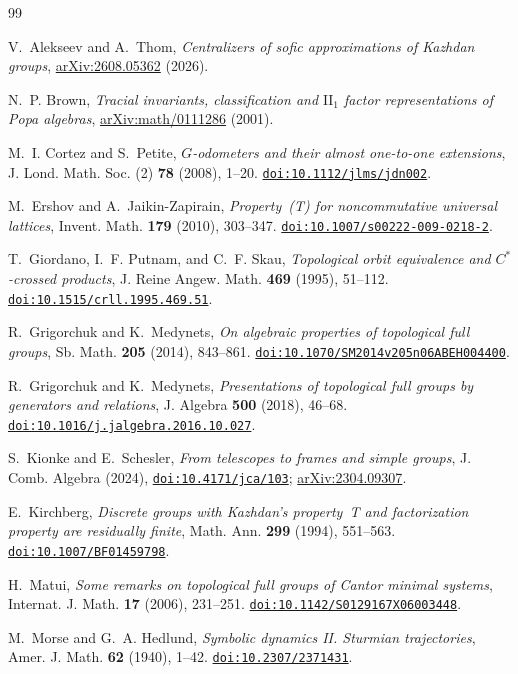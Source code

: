 \documentclass[11pt]{amsart}
\newcommand{\doi}[1]{\href{https://doi.org/#1}{\nolinkurl{doi:#1}}}
\begin{document}
\begin{thebibliography}{99}

V.~Alekseev and A.~Thom,
\emph{Centralizers of sofic approximations of Kazhdan groups},
\href{https://arxiv.org/abs/2608.05362}{arXiv:2608.05362} (2026).

N.~P. Brown, \emph{Tracial invariants, classification and
$\mathrm{II}_1$ factor representations of Popa algebras},
\href{https://arxiv.org/abs/math/0111286}{arXiv:math/0111286} (2001).

M.~I. Cortez and S.~Petite,
\emph{$G$-odometers and their almost one-to-one extensions},
J. Lond. Math. Soc. (2) \textbf{78} (2008), 1--20.
\doi{10.1112/jlms/jdn002}.

M.~Ershov and A.~Jaikin-Zapirain,
\emph{Property~\textup{(T)} for noncommutative universal lattices},
Invent. Math. \textbf{179} (2010), 303--347.
\doi{10.1007/s00222-009-0218-2}.

T.~Giordano, I.~F. Putnam, and C.~F. Skau,
\emph{Topological orbit equivalence and $C^*$-crossed products},
J. Reine Angew. Math. \textbf{469} (1995), 51--112.
\doi{10.1515/crll.1995.469.51}.

R.~Grigorchuk and K.~Medynets,
\emph{On algebraic properties of topological full groups},
Sb. Math. \textbf{205} (2014), 843--861.
\doi{10.1070/SM2014v205n06ABEH004400}.

R.~Grigorchuk and K.~Medynets,
\emph{Presentations of topological full groups by generators and
relations}, J. Algebra \textbf{500} (2018), 46--68.
\doi{10.1016/j.jalgebra.2016.10.027}.

S.~Kionke and E.~Schesler,
\emph{From telescopes to frames and simple groups},
J. Comb. Algebra (2024), \doi{10.4171/jca/103};
\href{https://arxiv.org/abs/2304.09307}{arXiv:2304.09307}.

E.~Kirchberg, \emph{Discrete groups with Kazhdan's property~\textup{T}
and factorization property are residually finite},
Math. Ann. \textbf{299} (1994), 551--563.
\doi{10.1007/BF01459798}.

H.~Matui, \emph{Some remarks on topological full groups of Cantor
minimal systems}, Internat. J. Math. \textbf{17} (2006), 231--251.
\doi{10.1142/S0129167X06003448}.

M.~Morse and G.~A. Hedlund,
\emph{Symbolic dynamics II. Sturmian trajectories},
Amer. J. Math. \textbf{62} (1940), 1--42.
\doi{10.2307/2371431}.


\end{thebibliography}
\end{document}
